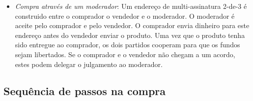 \begin{itemize}
\begin{itemize}
    \end{itemize}{}
    \item {\em Compra através de um moderador}: Um endereço de multi-assinatura 2-de-3 é construido entre o comprador o vendedor e o moderador. O moderador é aceite pelo comprador e pelo vendedor. O comprador envia dinheiro para este endereço antes do vendedor enviar o produto. Uma vez que o produto tenha sido entregue ao comprador, os dois partidos cooperam para que os fundos sejam libertados. Se o comprador e o vendedor não chegam a um acordo, estes podem delegar o julgamento ao moderador.  
\end{itemize}




\subsection{Sequência de passos na compra}
\label{subsec:escrowed-marketplace-purchasing-workflow}

